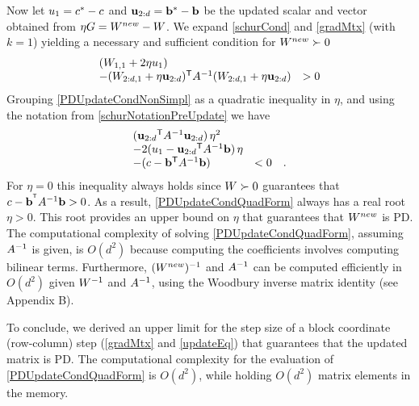 \documentclass{article}
\begin{document}
%
Now let ${u}_{1} = c^* - c$ and $\mathbf{u}_{2:d} = \mathbf{b}^* - \mathbf{b}$ be the updated scalar and vector
obtained from $\eta G = {{W^{new}}} - {W}$. We expand \eqref{schurCond} and
\eqref{gradMtx} (with $k=1$) yielding a necessary and sufficient condition for ${{W^{new}}} \succ 0$
\begin{equation}
  \begin{array}{ll} 
    ({W}_{1,1} + 2\eta {u}_{1}) \\
    -({W}_{2:d,1} + \eta \mathbf{u}_{2:d}){}^\mathsf{T} A^{-1} ({W}_{2:d,1} + \eta \mathbf{u}_{2:d})  & > 0
  \end{array}
  \label{PDUpdateCondNonSimpl}
\end{equation}
Grouping \eqref{PDUpdateCondNonSimpl} as a quadratic inequality in $\eta$, and using the notation from \eqref{schurNotationPreUpdate} we have
\begin{equation}
  \begin{array}{ll} 
    (\mathbf{u}_{2:d}{}^\mathsf{T} A^{-1} \mathbf{u}_{2:d}) \, \eta^2 \\
    -2({u}_{1} - \mathbf{u}_{2:d}{}^\mathsf{T} A^{-1} \mathbf{b}) \,\eta \\
    -(c - \mathbf{b}{}^\mathsf{T}  A^{-1} \mathbf{b}) & < 0 \quad .
  \end{array}
  \label{PDUpdateCondQuadForm}
\end{equation}
For $\eta = 0$ this inequality always
holds since ${W} \succ 0$ guarantees that $c-\mathbf{b}^{{}^\mathsf{T}} A^{-1} \mathbf{b} >0$. As a result,
 \eqref{PDUpdateCondQuadForm} always has a real
root $\eta > 0$. This root provides an upper bound on $\eta$ that guarantees that ${{W^{new}}}$ is PD.  The computational complexity of solving \eqref{PDUpdateCondQuadForm}, assuming $A^{-1}$ is given, is $O(d^2)$ because computing the coefficients involves computing bilinear terms.
Furthermore, $({{W^{new}}})^{-1}$ and $A^{-1}$ can be computed efficiently in $O(d^2)$ given ${W}^{-1}$ and $A^{-1}$, using the Woodbury inverse matrix identity (see Appendix B).

To conclude, we derived an upper limit for the step size of a block coordinate (row-column) step (\eqref{gradMtx} and \eqref{updateEq}) that guarantees that the updated matrix is PD. The computational complexity for the evaluation
of \eqref{PDUpdateCondQuadForm} is $O(d^2)$, while holding $O(d^2)$ matrix elements in the memory.
\end{document}
